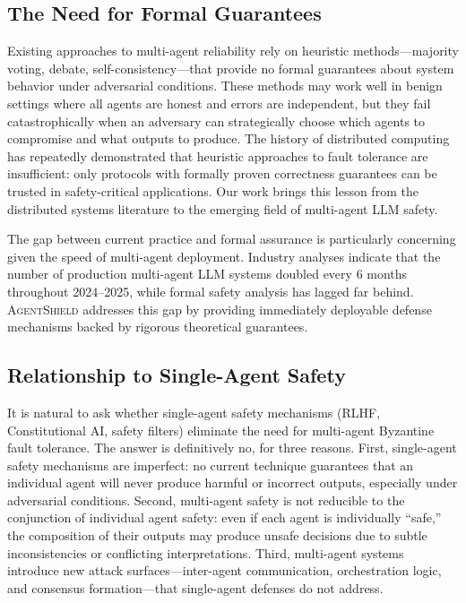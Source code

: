 \documentclass[journal,10pt]{IEEEtran}
\begin{document}
\subsection{The Need for Formal Guarantees}
Existing approaches to multi-agent reliability rely on heuristic methods---majority voting, debate, self-consistency---that provide no formal guarantees about system behavior under adversarial conditions. These methods may work well in benign settings where all agents are honest and errors are independent, but they fail catastrophically when an adversary can strategically choose which agents to compromise and what outputs to produce. The history of distributed computing has repeatedly demonstrated that heuristic approaches to fault tolerance are insufficient: only protocols with formally proven correctness guarantees can be trusted in safety-critical applications. Our work brings this lesson from the distributed systems literature to the emerging field of multi-agent LLM safety.

The gap between current practice and formal assurance is particularly concerning given the speed of multi-agent deployment. Industry analyses indicate that the number of production multi-agent LLM systems doubled every 6 months throughout 2024--2025, while formal safety analysis has lagged far behind. \textsc{AgentShield} addresses this gap by providing immediately deployable defense mechanisms backed by rigorous theoretical guarantees.

\subsection{Relationship to Single-Agent Safety}
It is natural to ask whether single-agent safety mechanisms (RLHF, Constitutional AI, safety filters) eliminate the need for multi-agent Byzantine fault tolerance. The answer is definitively no, for three reasons. First, single-agent safety mechanisms are imperfect: no current technique guarantees that an individual agent will never produce harmful or incorrect outputs, especially under adversarial conditions. Second, multi-agent safety is not reducible to the conjunction of individual agent safety: even if each agent is individually ``safe,'' the composition of their outputs may produce unsafe decisions due to subtle inconsistencies or conflicting interpretations. Third, multi-agent systems introduce new attack surfaces---inter-agent communication, orchestration logic, and consensus formation---that single-agent defenses do not address.
\end{document}
